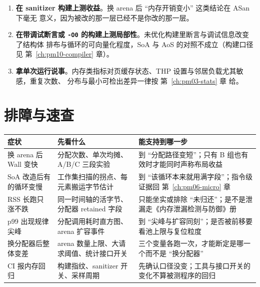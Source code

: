 \documentclass[12pt,a4paper,fontset=fandol]{ctexbook}
\newcommand{\Tp}[1]{\texttt{#1}}
\newcommand{\Lang}[1]{\textsf{#1}}
\newcommand{\MWall}{\Lang{Wall}}
\newcommand{\Mx}[1]{\textsf{#1}}
\begin{document}
\begin{warning}[title={三个不能下结论的时刻}]
  \begin{enumerate}
    \item \textbf{在 sanitizer 构建上测收益}。换 arena 后 ``内存开销变小'' 这类结论在 ASan 下毫无
          意义，因为被改的那一层已经不是你改的那一层。
    \item \textbf{在带调试断言或 \Tp{-O0} 的构建上测局部性}。未优化构建里断言与调试信息改变了结构体
          排布与循环的可向量化程度，SoA 与 AoS 的对照不成立（构建口径见 第~\ref{ch:pm10-compiler} 章）。
    \item \textbf{拿单次运行说事}。内存类指标对页缓存状态、THP 设置与邻居负载尤其敏感，重复次数、
          分布与最小可检出差异一律按 第~\ref{ch:pm03-stats} 章 给。
  \end{enumerate}
\end{warning}

\section{排障与速查}
\label{sec:pm07-troubleshoot}

\begin{compare}[title={症状、第一手指标与结论边界}]
\begin{tabular}{>{\raggedright\arraybackslash}p{}
                >{\raggedright\arraybackslash}p{}
                >{\raggedright\arraybackslash}p{}}
\hline
症状 & 先看什么 & 能支持到哪一步 \\
\hline
换 arena 后 \MWall{} 变快 & 分配次数、单次均摊、A/B/C 三段实验 &
到 ``分配路径变短''；只有 B 组也有效时才能同时声称布局收益 \\
\hline
SoA 改造后有的循环变慢 & 工作集扫描的拐点、每元素搬运字节估计 &
到 ``该循环本来就用满字段''；指令级证据回 第~\ref{ch:pm06-micro} 章 \\
\hline
\Mx{RSS} 长跑只涨不跌 & 同一时间轴的活字节、分配器 retained 字段 &
只能坐实或排除 ``未归还''；是不是泄漏走《内存泄漏检测与防御》册 \\
\hline
\Mx{p99} 出现规律尖峰 & 分配调用耗时直方图、arena 扩容事件 &
到 ``尖峰与扩容同刻''；是否被前移要看池上限与复位粒度 \\
\hline
换分配器后整体变差 & arena 数量上限、大请求阈值、统计接口开关 &
三个变量各跑一次，才能断定是哪一个而不是 ``换分配器'' \\
\hline
CI 报内存回归 & 构建指纹、sanitizer 开关、采样周期 &
先确认口径没变；工具与接口开关的变化不算被测程序的回归 \\
\hline
\end{tabular}
\end{compare}
\end{document}
